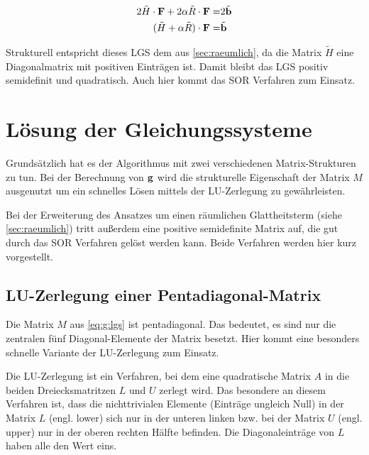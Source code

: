 \begin{align}
2 \tilde H \cdot \mathbf F + 2 \alpha \tilde R\cdot \mathbf F =& 2 \tilde{\mathbf b} \\
(\tilde H+\alpha \tilde R)\cdot \mathbf F =& \tilde{\mathbf b}
\end{align}

Strukturell entspricht dieses LGS dem aus \autoref{sec:raeumlich}, da die Matrix $\tilde H$ eine Diagonalmatrix mit positiven Einträgen ist. Damit bleibt das LGS positiv semidefinit und quadratisch. Auch hier kommt das \gls{SOR} Verfahren zum Einsatz.




\section{Lösung der Gleichungssysteme}
\label{sec:solvers}
Grundsätzlich hat es der Algorithmus mit zwei verschiedenen Matrix-Strukturen zu tun. Bei der Berechnung von $\mathbf g$ wird die strukturelle Eigenschaft der Matrix $M$ ausgenutzt um ein schnelles Lösen mittels der LU-Zerlegung zu gewährleisten.

Bei der Erweiterung des Ansatzes um einen räumlichen Glattheitsterm (siehe \autoref{sec:raeumlich}) tritt außerdem eine positive semidefinite Matrix auf, die gut durch das \gls{SOR} Verfahren gelöst werden kann. Beide Verfahren werden hier kurz vorgestellt.



\subsection{LU-Zerlegung einer Pentadiagonal-Matrix}
\label{sec:maths:lu}
Die Matrix $M$ aus \autoref{eq:g:lgs} ist pentadiagonal. Das bedeutet, es sind nur die zentralen fünf Diagonal-Elemente der Matrix besetzt. Hier kommt eine besonders schnelle Variante der LU-Zerlegung zum Einsatz.

Die LU-Zerlegung ist ein Verfahren, bei dem eine quadratische Matrix $A$ in die beiden Dreiecksmatritzen $L$ und $U$ zerlegt wird. Das besondere an diesem Verfahren ist, dass die nichttrivialen Elemente (Einträge ungleich Null) in der Matrix $L$ (engl. lower) sich nur in der unteren linken bzw. bei der Matrix $U$ (engl. upper) nur in der oberen rechten Hälfte befinden. Die Diagonaleinträge von $L$ haben alle den Wert eins. 

